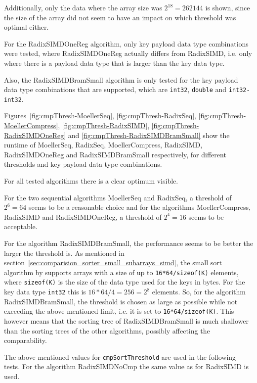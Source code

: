 \documentclass[12pt, a4paper, openright, twoside]{tiarbeit}
\begin{document}
Additionally, only the data where the array size
was $2^{18}=262144$ is shown, since the size of the array did not seem to
have an impact on which threshold was optimal either.

For the RadixSIMDOneReg algorithm, only key payload data type
combinations were tested, where RadixSIMDOneReg actually differs from
RadixSIMD, i.e. only where there is a payload data type that is larger
than the key data type.

Also, the RadixSIMDBramSmall algorithm is only tested for the key
payload data type combinations that are supported, which are
\texttt{int32}, \texttt{double} and \texttt{int32-int32}.



Figures~\ref{fig:cmpThresh-MoellerSeq}, \ref{fig:cmpThresh-RadixSeq},
\ref{fig:cmpThresh-MoellerCompress}, \ref{fig:cmpThresh-RadixSIMD},
\ref{fig:cmpThresh-RadixSIMDOneReg} and \ref{fig:cmpThresh-RadixSIMDBramSmall}
show the runtime of MoellerSeq, RadixSeq, MoellerCompress, RadixSIMD,
RadixSIMDOneReg and RadixSIMDBramSmall
respectively, for different thresholds and key payload data type combinations.

For all tested algorithms there is a clear optimum visible.

For the two sequential algorithms MoellerSeq and RadixSeq, a threshold of $2^6=64$ seems
to be a reasonable choice and for the algorithms MoellerCompress, RadixSIMD and
RadixSIMDOneReg, a threshold of $2^4=16$ seems to be acceptable.

For the algorithm RadixSIMDBramSmall, the performance seems to be better the
larger the threshold is.
As mentioned in section~\ref{sec:comparision_sorter_small_subarrays_simd},
the small sort algorithm by \citet{bramas} supports arrays with a size of
up to \texttt{16*64/sizeof(K)}
elements, where \texttt{sizeof(K)} is the size of the data type
used for the keys in bytes. For the key data type \texttt{int32}
this is $16*64/4=256=2^{8}$ elements.
So, for the algorithm RadixSIMDBramSmall, the threshold is chosen
as large as possible while not exceeding the above mentioned limit,
i.e. it is set to \texttt{16*64/sizeof(K)}.
This however means that the sorting tree of RadixSIMDBramSmall
is much shallower than the sorting trees of the other algorithms,
possibly affecting the comparability.

The above mentioned values for \texttt{cmpSortThreshold} are used in the
following tests. For the algorithm RadixSIMDNoCmp the same value as
for RadixSIMD is used.
\end{document}
